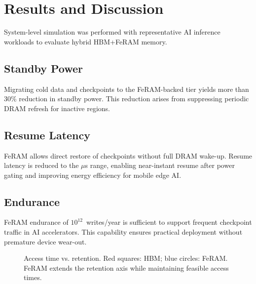 \section{Results and Discussion}
System-level simulation was performed with representative AI inference workloads to evaluate hybrid HBM+FeRAM memory.

\subsection{Standby Power}
Migrating cold data and checkpoints to the FeRAM-backed tier yields more than 30\% reduction in standby power.  
This reduction arises from suppressing periodic DRAM refresh for inactive regions.

\subsection{Resume Latency}
FeRAM allows direct restore of checkpoints without full DRAM wake-up.  
Resume latency is reduced to the $\mu$s range, enabling near-instant resume after power gating and improving energy efficiency for mobile edge AI.

\subsection{Endurance}
FeRAM endurance of $10^{12}$~writes/year is sufficient to support frequent checkpoint traffic in AI accelerators.  
This capability ensures practical deployment without premature device wear-out.

\begin{figure}[!t]
\centering
{}
\caption{Access time vs. retention. Red squares: HBM; blue circles: FeRAM. FeRAM extends the retention axis while maintaining feasible access times.}
\label{fig:retention_tradeoff}
\end{figure}
